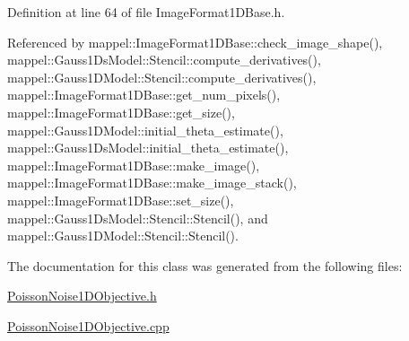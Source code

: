 Definition at line 64 of file Image\+Format1\+D\+Base.\+h.



Referenced by mappel\+::\+Image\+Format1\+D\+Base\+::check\+\_\+image\+\_\+shape(), mappel\+::\+Gauss1\+Ds\+Model\+::\+Stencil\+::compute\+\_\+derivatives(), mappel\+::\+Gauss1\+D\+Model\+::\+Stencil\+::compute\+\_\+derivatives(), mappel\+::\+Image\+Format1\+D\+Base\+::get\+\_\+num\+\_\+pixels(), mappel\+::\+Image\+Format1\+D\+Base\+::get\+\_\+size(), mappel\+::\+Gauss1\+D\+Model\+::initial\+\_\+theta\+\_\+estimate(), mappel\+::\+Gauss1\+Ds\+Model\+::initial\+\_\+theta\+\_\+estimate(), mappel\+::\+Image\+Format1\+D\+Base\+::make\+\_\+image(), mappel\+::\+Image\+Format1\+D\+Base\+::make\+\_\+image\+\_\+stack(), mappel\+::\+Image\+Format1\+D\+Base\+::set\+\_\+size(), mappel\+::\+Gauss1\+Ds\+Model\+::\+Stencil\+::\+Stencil(), and mappel\+::\+Gauss1\+D\+Model\+::\+Stencil\+::\+Stencil().



The documentation for this class was generated from the following files\+:\begin{DoxyCompactItemize}
\item 
\hyperlink{PoissonNoise1DObjective_8h}{Poisson\+Noise1\+D\+Objective.\+h}\item 
\hyperlink{PoissonNoise1DObjective_8cpp}{Poisson\+Noise1\+D\+Objective.\+cpp}\end{DoxyCompactItemize}
